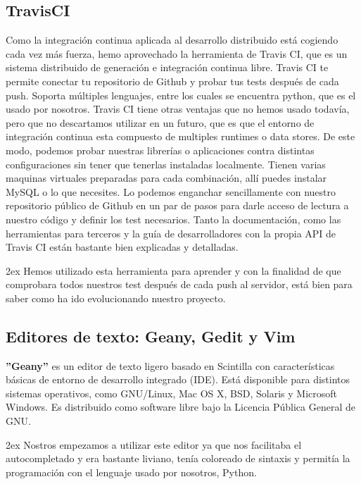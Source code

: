 \documentclass[12pt,a4paper]{report}
\begin{document}
\subsection{TravisCI}

Como la integración continua aplicada al desarrollo distribuido está cogiendo
cada vez más fuerza, hemo aprovechado la herramienta de Travis CI, que es un
sistema distribuido de generación e integración continua libre.
Travis CI te permite conectar tu repositorio de Github y probar tus tests
después de cada push. Soporta múltiples lenguajes, entre los cuales se encuentra
python, que es el usado por nosotros.
Travis CI tiene otras ventajas que no hemos usado todavía, pero que no
descartamos utilizar en un futuro, que es que el entorno de integración continua
esta compuesto de multiples runtimes o data stores. De este modo, podemos probar
nuestras librerías o aplicaciones contra distintas configuraciones sin tener que
tenerlas instaladas localmente. Tienen varias maquinas virtuales preparadas para
cada combinación, allí puedes instalar MySQL o lo que necesites.
Lo podemos enganchar sencillamente con nuestro repositorio público de Github en
un par de pasos para darle acceso de lectura a nuestro código y definir los test
necesarios. Tanto la documentación, como las herramientas para terceros y la
guía de desarrolladores con la propia API de Travis CI están bastante bien
explicadas y detalladas. 

\parskip 2ex
Hemos utilizado esta herramienta para aprender y con la finalidad de que
comprobara todos nuestros test después de cada push al servidor, está bien para
saber como ha ido evolucionando nuestro proyecto. 

\subsection{Editores de texto: Geany, Gedit y Vim}

\textbf{''Geany''} es un editor de texto ligero basado en Scintilla con características
básicas de entorno de desarrollo integrado (IDE). Está disponible para distintos
sistemas operativos, como GNU/Linux, Mac OS X, BSD, Solaris y Microsoft Windows.
Es distribuido como software libre bajo la Licencia Pública General de GNU.

\parskip 2ex
Nostros empezamos a utilizar este editor ya que nos facilitaba el autocompletado
y era bastante liviano, tenía coloreado de sintaxis y permitía la programación
con el lenguaje usado por nosotros, Python. 
\end{document}
